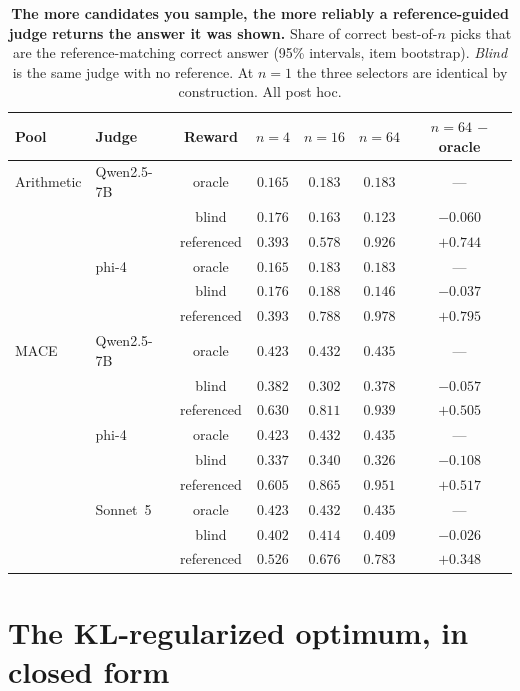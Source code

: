 \begin{table}[htbp]
\centering
\footnotesize
\caption{\textbf{The more candidates you sample, the more reliably a reference-guided judge returns
the answer it was shown.} Share of correct best-of-$n$ picks that are the reference-matching correct
answer (95\% intervals, item bootstrap). \emph{Blind} is the same judge with no reference. At $n=1$
the three selectors are identical by construction. All post hoc.\ph}
\label{tab:bonref}
\setlength{\tabcolsep}{4pt}
\begin{tabular}{@{}llccccc@{}}
\toprule
Pool & Judge & Reward & $n{=}4$ & $n{=}16$ & $n{=}64$ & $n{=}64$ $-$ oracle \\
\midrule
Arithmetic & Qwen2.5-7B & oracle & $0.165$ & $0.183$ & $0.183$ & --- \\
 & & blind & $0.176$ & $0.163$ & $0.123$ & $-0.060$ \\
 & & referenced & $0.393$ & $0.578$ & $\mathbf{0.926}$ & $+0.744$ \\
 & phi-4 & oracle & $0.165$ & $0.183$ & $0.183$ & --- \\
 & & blind & $0.176$ & $0.188$ & $0.146$ & $-0.037$ \\
 & & referenced & $0.393$ & $0.788$ & $\mathbf{0.978}$ & $+0.795$ \\
\midrule
\textsc{MACE} & Qwen2.5-7B & oracle & $0.423$ & $0.432$ & $0.435$ & --- \\
 & & blind & $0.382$ & $0.302$ & $0.378$ & $-0.057$ \\
 & & referenced & $0.630$ & $0.811$ & $\mathbf{0.939}$ & $+0.505$ \\
 & phi-4 & oracle & $0.423$ & $0.432$ & $0.435$ & --- \\
 & & blind & $0.337$ & $0.340$ & $0.326$ & $-0.108$ \\
 & & referenced & $0.605$ & $0.865$ & $\mathbf{0.951}$ & $+0.517$ \\
 & Sonnet~5 & oracle & $0.423$ & $0.432$ & $0.435$ & --- \\
 & & blind & $0.402$ & $0.414$ & $0.409$ & $-0.026$ \\
 & & referenced & $0.526$ & $0.676$ & $\mathbf{0.783}$ & $+0.348$ \\
\bottomrule
\end{tabular}
\end{table}

\section{The KL-regularized optimum, in closed form}
\label{app:kltilt}

